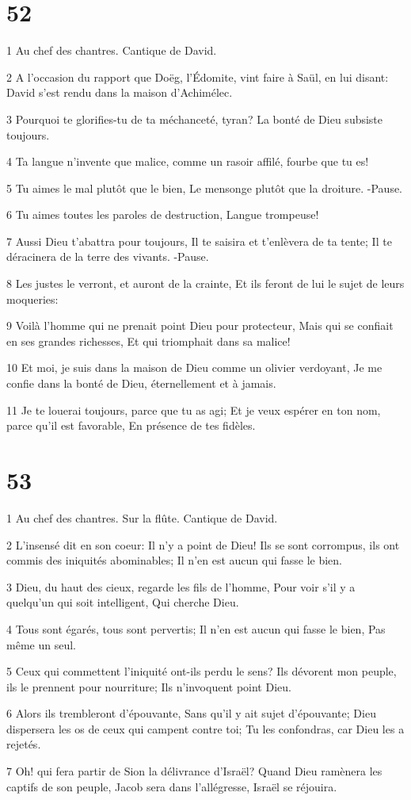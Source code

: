 \chapter{52}

\par 1 Au chef des chantres. Cantique de David.
\par 2 A l'occasion du rapport que Doëg, l'Édomite, vint faire à Saül, en lui disant: David s'est rendu dans la maison d'Achimélec.
\par 3 Pourquoi te glorifies-tu de ta méchanceté, tyran? La bonté de Dieu subsiste toujours.
\par 4 Ta langue n'invente que malice, comme un rasoir affilé, fourbe que tu es!
\par 5 Tu aimes le mal plutôt que le bien, Le mensonge plutôt que la droiture. -Pause.
\par 6 Tu aimes toutes les paroles de destruction, Langue trompeuse!
\par 7 Aussi Dieu t'abattra pour toujours, Il te saisira et t'enlèvera de ta tente; Il te déracinera de la terre des vivants. -Pause.
\par 8 Les justes le verront, et auront de la crainte, Et ils feront de lui le sujet de leurs moqueries:
\par 9 Voilà l'homme qui ne prenait point Dieu pour protecteur, Mais qui se confiait en ses grandes richesses, Et qui triomphait dans sa malice!
\par 10 Et moi, je suis dans la maison de Dieu comme un olivier verdoyant, Je me confie dans la bonté de Dieu, éternellement et à jamais.
\par 11 Je te louerai toujours, parce que tu as agi; Et je veux espérer en ton nom, parce qu'il est favorable, En présence de tes fidèles.

\chapter{53}

\par 1 Au chef des chantres. Sur la flûte. Cantique de David.
\par 2 L'insensé dit en son coeur: Il n'y a point de Dieu! Ils se sont corrompus, ils ont commis des iniquités abominables; Il n'en est aucun qui fasse le bien.
\par 3 Dieu, du haut des cieux, regarde les fils de l'homme, Pour voir s'il y a quelqu'un qui soit intelligent, Qui cherche Dieu.
\par 4 Tous sont égarés, tous sont pervertis; Il n'en est aucun qui fasse le bien, Pas même un seul.
\par 5 Ceux qui commettent l'iniquité ont-ils perdu le sens? Ils dévorent mon peuple, ils le prennent pour nourriture; Ils n'invoquent point Dieu.
\par 6 Alors ils trembleront d'épouvante, Sans qu'il y ait sujet d'épouvante; Dieu dispersera les os de ceux qui campent contre toi; Tu les confondras, car Dieu les a rejetés.
\par 7 Oh! qui fera partir de Sion la délivrance d'Israël? Quand Dieu ramènera les captifs de son peuple, Jacob sera dans l'allégresse, Israël se réjouira.

